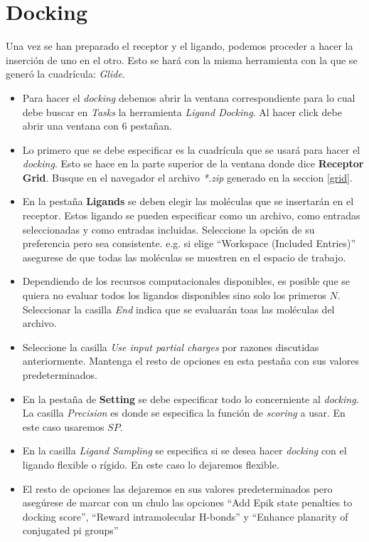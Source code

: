 \documentclass{article}
\begin{document}
\section{Docking}
\label{docking}
Una vez se han preparado el receptor y el ligando, podemos proceder a hacer la inserción de uno en el otro. Esto se hará con la misma herramienta con la que se generó la cuadrícula: \emph{Glide}.

\begin{itemize}
    \item Para hacer el \emph{docking} debemos abrir la ventana correspondiente para lo cual debe buscar en \emph{Tasks} la herramienta \emph{Ligand Docking}. Al hacer click debe abrir una ventana con 6 pestañan.
    \item Lo primero que se debe especificar es la cuadrícula que se usará para hacer el \emph{docking}. Esto se hace en la parte superior de la ventana donde dice \textbf{Receptor Grid}. Busque en el navegador el archivo \emph{*.zip} generado en la seccion \ref{grid}.
    \item En la pestaña \textbf{Ligands} se deben elegir las moléculas que se insertarán en el receptor. Estos ligando se pueden especificar como un archivo, como entradas seleccionadas y como entradas incluidas. Seleccione la opción de su preferencia pero sea consistente. e.g. si elige ``Workspace (Included Entries)'' asegurese de que todas las moléculas se muestren en el espacio de trabajo.
    \item Dependiendo de los recursos computacionales disponibles, es posible que se quiera no evaluar todos los ligandos disponibles sino solo los primeros $N$. Seleccionar la casilla \emph{End} indica que se evaluarán toas las moléculas del archivo.
    \item Seleccione la casilla \emph{Use input partial charges} por razones discutidas anteriormente. Mantenga el resto de opciones en esta pestaña con sus valores predeterminados.
    \item En la pestaña de \textbf{Setting} se debe especificar todo lo concerniente al \emph{docking}. La casilla \emph{Precision} es donde se especifica la función de \emph{scoring} a usar. En este caso usaremos $SP$.
    \item En la casilla \emph{Ligand Sampling} se especifica si se desea hacer \emph{docking} con el ligando flexible o rígido. En este caso lo dejaremos flexible.
    \item El resto de opciones las dejaremos en sus valores predeterminados pero asegúrese de marcar con un chulo las opciones ``Add Epik state penalties to docking score'', ``Reward intramolecular H-bonds'' y ``Enhance planarity of conjugated pi groups''

\end{itemize}
\end{document}
